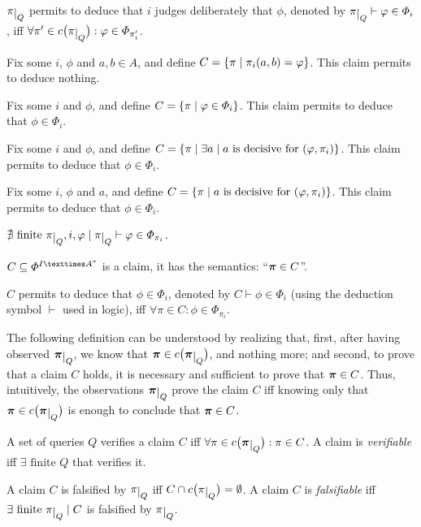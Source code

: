 \documentclass[version=3.21, pagesize, twoside=off, bibliography=totoc, DIV=calc, fontsize=12pt, a4paper]{scrartcl}
\begin{document}
$\piQ$ permits to deduce that $i$ judges deliberately that $\phi$, denoted by $\piQ \vdash \phi \in \Phi_i$, iff $\forall \pi' \in \cpiQ: \phi \in \Phi_{\pi'_i}$.

\begin{example}
	\label{ex:anecdotal}
	Fix some $i$, $\phi$ and $a, b \in A$, and define $C = \set{\pi \suchthat \pi_i(a, b) = \phi}$.
	This claim permits to deduce nothing.
\end{example}
\begin{example}
	\label{ex:direct}
	Fix some $i$ and $\phi$, and define $C = \set{\pi \suchthat \phi \in \Phi_i}$.
	This claim permits to deduce that $\phi \in \Phi_i$.
\end{example}
\begin{example}
	\label{ex:decisiveness}
	Fix some $i$ and $\phi$, and define $C = \set{\pi \suchthat \exists a \suchthat a \text{ is decisive for } (\phi, \pi_i)}$. 
	This claim permits to deduce that $\phi \in \Phi_i$.
\end{example}
\begin{example}
	\label{ex:substantial}
	Fix some $i$, $\phi$ and $a$, and define $C = \set{\pi \suchthat a \text{ is decisive for } (\phi, \pi_i)}$.
	This claim permits to deduce that $\phi \in \Phi_i$.
\end{example}

\begin{proposition}
	$\nexists \text{ finite } \piQ, i, \phi \suchthat \piQ \vdash \phi \in \Phi_{\pi_i}$.
\end{proposition}

$C \subseteq \Phi^{I × \Astar}$ is a claim, it has the semantics: “$\bm{\pi} \in C$”.

$C$ permits to deduce that $\phi \in \Phi_i$, denoted by $C \vdash \phi \in \Phi_i$ (using the deduction symbol $\vdash$ used in logic), iff $\forall \pi \in C: \phi \in \Phi_{\pi_i}$.

The following definition can be understood by realizing that, first, after having observed $\pibQ$, we know that $\pib \in \cpibQ$, and nothing more; and second, to prove that a claim $C$ holds, it is necessary and sufficient to prove that $\bm{\pi} \in C$. Thus, intuitively, the observations $\pibQ$ prove the claim $C$ iff knowing only that $\pib \in \cpibQ$ is enough to conclude that $\bm{\pi} \in C$.
\begin{definition}[Verification]
	\label{def:verif}
	A set of queries $Q$ verifies a claim $C$ iff $\forall \pi \in \cpibQ: \pi \in C$.
	A claim is \emph{verifiable} iff $\exists \text{ finite } Q$ that verifies it.
\end{definition}
\begin{definition}[Falsification]
	\label{def:fals}
	A claim $C$ is falsified by $\piQ$ iff $C \cap \cpiQ = \emptyset$. 
	A claim $C$ is \emph{falsifiable} iff $\exists \text{ finite } \piQ \suchthat C$ is falsified by $\piQ$.
\end{definition}
\end{document}
